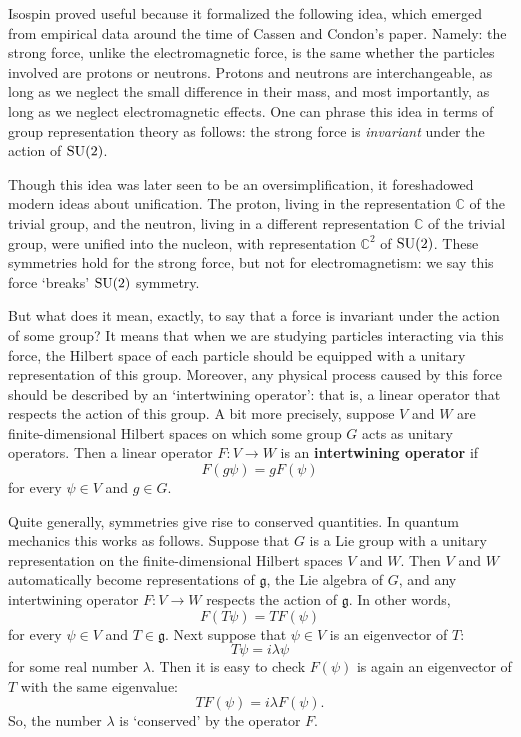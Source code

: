 \documentclass[12pt]{article}
\newcommand{\maps}{\colon}    %
\newcommand{\C}{{\mathbb C}}  %
\newcommand{\SU}{{\rm SU}}    %
\newcommand{\g}{{\mathfrak{g}}}  %
\begin{document}
Isospin proved useful because it formalized the following idea, which
emerged from empirical data around the time of Cassen and Condon's
paper.  Namely: the strong force, unlike the electromagnetic force, is
the same whether the particles involved are protons or neutrons.
Protons and neutrons are interchangeable, as long as we neglect the
small difference in their mass, and most importantly, as long as we
neglect electromagnetic effects.  One can phrase this idea in terms of
group representation theory as follows: the strong force is
\emph{invariant} under the action of $\SU(2)$.

Though this idea was later seen to be an oversimplification, 
it foreshadowed modern ideas about unification. The proton, living in the
representation $\C$ of the trivial group, and the neutron, living in a
different representation $\C$ of the trivial group, were unified into the
nucleon, with representation $\C^2$ of $\SU(2)$.  These symmetries hold 
for the strong force, but not for electromagnetism: we say this force
`breaks' $\SU(2)$ symmetry.

But what does it mean, exactly, to say that a force is invariant under the 
action of some group?    It means that when we are studying particles 
interacting via this force, the Hilbert space of each particle
should be equipped with a unitary representation of this group.
Moreover, any physical process caused by this force should be described 
by an `intertwining operator': that is, a linear operator that
respects the action of this group.  A bit more precisely, suppose
$V$ and $W$ are finite-dimensional Hilbert spaces on which some group 
$G$ acts as unitary operators.  Then a linear operator $F \maps V \to W$ is
an \textbf{intertwining operator} if 
\[            F(g \psi) = gF(\psi)   \]
for every $\psi \in V$ and $g \in G$.

Quite generally, symmetries give rise to conserved quantities.  
In quantum mechanics this works as follows.  Suppose that $G$ is
a Lie group with a unitary representation on the finite-dimensional
Hilbert spaces $V$ and $W$.  Then $V$ and $W$ automatically become 
representations of $\g$, the Lie algebra of $G$, and any intertwining operator 
$F \maps V \to W$ respects the action of $\g$.  In other words,
\[              F(T \psi) = T F(\psi)  \]
for every $\psi \in V$ and $T \in \g$.
Next suppose that $\psi \in V$ is an eigenvector of $T$:
\[                  T\psi = i \lambda \psi  \]
for some real number $\lambda$.  Then it is easy to check $F(\psi)$ 
is again an eigenvector of $T$ with the same eigenvalue:
\[                 T F(\psi) = i \lambda F(\psi)  .\]
So, the number $\lambda$ is `conserved' by the operator $F$. 
\end{document}
